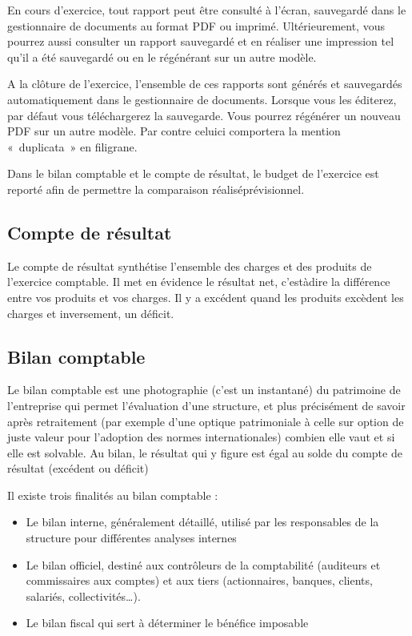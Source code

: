 \documentclass[a4paper,10pt,oneside,french]{sphinxmanual}
\begin{document}
En cours d’exercice, tout rapport peut être consulté à l’écran, sauvegardé dans le gestionnaire de documents au format PDF ou imprimé. Ultérieurement, vous pourrez aussi consulter un rapport sauvegardé et en réaliser une impression tel qu’il a été sauvegardé ou en le régénérant sur un autre modèle.

A la clôture de l’exercice, l’ensemble de ces rapports sont générés et sauvegardés automatiquement dans le gestionnaire de documents. Lorsque vous les éditerez, par défaut vous téléchargerez la sauvegarde. Vous pourrez régénérer un nouveau PDF sur un autre modèle. Par contre celui\sphinxhyphen{}ci comportera la mention « duplicata » en filigrane.

Dans le bilan comptable et le compte de résultat, le budget de l’exercice est reporté afin de permettre la comparaison réalisé\sphinxhyphen{}prévisionnel.


\subsection{Compte de résultat}
\label{\detokenize{accounting/reporting:compte-de-resultat}}
Le compte de résultat  synthétise l’ensemble des charges et des produits de l’exercice comptable.
Il met en évidence le résultat net, c’est\sphinxhyphen{}à\sphinxhyphen{}dire la différence entre vos produits et vos charges. Il y a excédent quand les produits excèdent les charges et inversement, un déficit.


\subsection{Bilan comptable}
\label{\detokenize{accounting/reporting:bilan-comptable}}
Le bilan comptable est une photographie (c’est un instantané) du patrimoine de l’entreprise qui permet l’évaluation d’une structure, et plus précisément de savoir après retraitement (par exemple d’une optique patrimoniale à celle sur option de juste valeur pour l’adoption des normes internationales) combien elle vaut et si elle est solvable.
Au bilan, le résultat qui y figure est égal au solde du compte de résultat (excédent ou déficit)

Il existe trois finalités au bilan comptable :
\begin{itemize}
\item {} 
Le bilan interne, généralement détaillé, utilisé par les responsables de la structure pour différentes analyses internes

\item {} 
Le bilan officiel, destiné aux contrôleurs de la comptabilité (auditeurs et commissaires aux comptes) et aux tiers (actionnaires, banques, clients, salariés, collectivités…).

\item {} 
Le bilan fiscal qui sert à déterminer le bénéfice imposable

\end{itemize}
\end{document}
